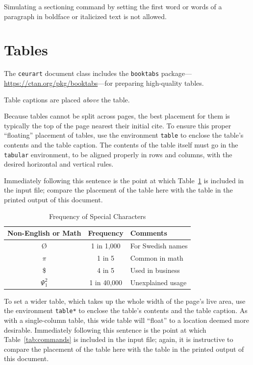 \documentclass[%
]{ceurart}
\begin{document}
Simulating a sectioning command by setting the first word or words of a paragraph in boldface or italicized text is not allowed.

\section{Tables}

The
\verb|ceurart|
document class includes the
\verb|booktabs|
package---\url{https://ctan.org/pkg/booktabs}---for preparing high-quality tables.

Table captions are placed \textit{above} the table.

Because tables cannot be split across pages, the best placement for them is typically the top of the page nearest their initial cite. To ensure this proper ``floating'' placement of tables, use the environment
\verb|table|
to enclose the table's contents and the table caption. The contents of the table itself must go in the
\verb|tabular|
environment, to be aligned properly in rows and columns, with the desired horizontal and vertical rules.

Immediately following this sentence is the point at which Table~\ref{tab:freq} is included in the input file; compare the placement of the table here with the table in the printed output of this document.

\begin{table}
  \caption{Frequency of Special Characters}
  \label{tab:freq}
  \begin{tabular}{ccl}
    \toprule
    Non-English or Math&Frequency&Comments\\
    \midrule
    \O & 1 in 1,000& For Swedish names\\
    $\pi$ & 1 in 5& Common in math\\
    \$ & 4 in 5 & Used in business\\
    $\Psi^2_1$ & 1 in 40,000& Unexplained usage\\
    \bottomrule
  \end{tabular}
\end{table}

To set a wider table, which takes up the whole width of the page's live area, use the environment
\verb|table*|
to enclose the table's contents and the table caption.  As with a single-column table, this wide table will
\enquote{float}
to a location deemed more desirable.
Immediately following this sentence is the point at which Table~\ref{tab:commands} is included in the input file; again, it is instructive to compare the placement of the table here with the table in the printed output of this document.
\end{document}
